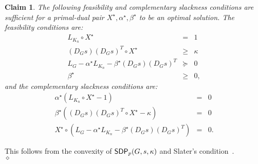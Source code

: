 \documentclass[11pt]{article}
\newtheorem{claim}{Claim}
\newenvironment{proof}{\noindent {\em Proof:}}{\\\hspace*{\fill}\mbox{$\diamond$}}
\newcommand{\sdp}{{\sf SDP}}
\begin{document}
\begin{claim}   The following feasibility and complementary slackness conditions are 
sufficient for a primal-dual pair 
$ X^\star,\alpha^\star,\beta^\star$ to be an optimal solution.
The feasibility conditions are:
\begin{eqnarray}
  L_{K_{n}} \circ  X^\star &=& 1  \label{F1} \\
 ( D_{G} {s})( D_{G} {s})^T \circ  X^\star &\geq& \kappa   \label{F2}  \\
  L_{G}- \alpha^\star  L_{K_{n}}  - \beta^\star ( D_{G} {s})( D_{G} {s})^T &\succeq& 0  \label{F3} \\
 \beta^\star &\geq& 0  \label{F4}  ,
\end{eqnarray}
and the complementary slackness conditions are:
\begin{eqnarray}
 \alpha^\star(  L_{K_{n}}  \circ  X^\star - 1) &=& 0 \label{C1} \\
 \beta^\star ( ( D_{G} {s})( D_{G} {s})^T \circ  X^\star - \kappa) &=& 0 \label{C2} \\
 X^\star \circ  ( L_{G}- \alpha^\star  L_{K_{n}}  - \beta^\star ( D_{G} {s})( D_{G} {s})^T ) &=& 0 \label{C3}  .
\end{eqnarray}
\end{claim}
\begin{proof}
This follows from the convexity of $\sdp_p(G,s, \kappa)$ and Slater's 
condition~\cite{Boyd04}.
\end{proof}
\end{document}
